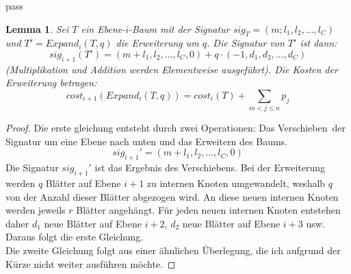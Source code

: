 pass\documentclass[a4paper,10pt,ngerman]{scrartcl}
\newtheorem{lemma}[satz]{Lemma}
\begin{document}
    \begin{lemma}
        Sei $T$ ein Ebene-$i$-Baum mit der Signatur $sig_T = (m;l_1,l_2,\dots,l_C)$ und $T' = Expand_i(T,q)$ die Erweiterung um $q$. Die Signatur von $T'$ ist dann: \[sig_{i+1}(T') = (m + l_1, l_2, \dots, l_C, 0) + q \cdot (-1, d_1, d_2, \dots, d_C)\]
        (Multiplikation und Addition werden Elementweise ausgeführt). Die Kosten der Erweiterung betragen:
        \[cost_{i+1}(Expand_i(T,q)) = cost_i(T) + \sum_{m < j \le n}p_j\]
    \end{lemma}
    \begin{proof}
        Die erste gleichung entsteht durch zwei Operationen: Das \glqq Verschieben\grqq\ der Signatur um eine Ebene nach unten und das Erweitern des Baums.
        \[sig_{i+1}' = (m + l_1, l_2, \dots, l_C, 0)\]
        Die Signatur $sig_{i+1}'$ ist das Ergebnis des Verschiebens.
        Bei der Erweiterung werden $q$ Blätter auf Ebene $i + 1$ zu internen Knoten umgewandelt, weshalb $q$ von der Anzahl dieser Blätter abgezogen wird.
        An diese neuen internen Knoten werden jeweils $r$ Blätter angehängt.
        Für jeden neuen internen Knoten entstehen daher $d_1$ neue Blätter auf Ebene $i+2$, $d_2$ neue Blätter auf Ebene $i+3$ usw.
        Daraus folgt die erste Gleichung. \\
        Die zweite Gleichung folgt aus einer ähnlichen Überlegung, die ich aufgrund der Kürze nicht weiter ausführen möchte.
    \end{proof}
\end{document}
